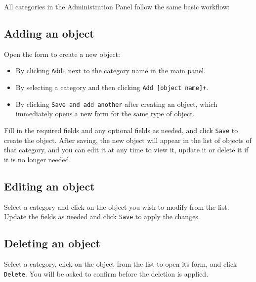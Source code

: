 

All categories in the Administration Panel follow the same basic workflow:

\subsection*{Adding an object}

Open the form to create a new object:

\begin{itemize}
	\item By clicking \texttt{Add+} next to the category name in the main panel.
	\item By selecting a category and then clicking \texttt{Add [object name]+}.
	\item By clicking \texttt{Save and add another} after creating an object, which immediately opens a new form for the same type of object.
\end{itemize}

	
Fill in the required fields and any optional fields as needed, and click \texttt{Save} to create the object. After saving, the new object will appear in the list of objects of that category, and you can edit it at any time to view it, update it or delete it if it is no longer needed. 

\subsection*{Editing an object}

Select a category and click on the object you wish to modify from the list. Update the fields as needed and click \texttt{Save} to apply the changes.


\subsection*{Deleting an object}

Select a category, click on the object from the list to open its form, and click \texttt{Delete}. You will be asked to confirm before the deletion is applied.

